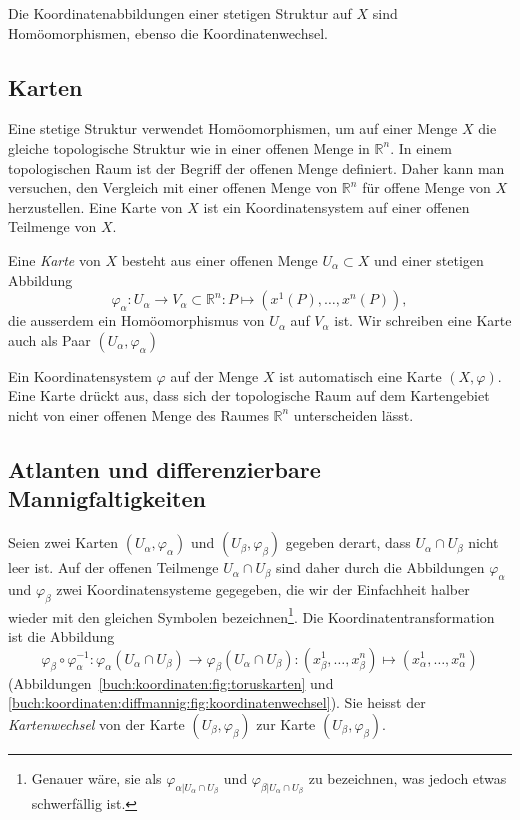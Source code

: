 Die Koordinatenabbildungen einer stetigen Struktur auf $X$ sind
Homöomorphismen, ebenso die Koordinatenwechsel.

%
%
\subsection{Karten}
Eine stetige Struktur verwendet Homöomorphismen, um auf einer Menge $X$
die gleiche topologische Struktur wie in einer offenen Menge in
$\mathbb{R}^n$.
In einem topologischen Raum ist der Begriff der offenen Menge definiert.
Daher kann man versuchen, den Vergleich mit einer offenen Menge von
$\mathbb{R}^n$ für offene Menge von $X$ herzustellen.
Eine Karte von $X$ ist ein Koordinatensystem auf einer offenen Teilmenge
von $X$.

\begin{definition}[Karte]
Eine \emph{Karte} von $X$ besteht aus einer offenen Menge $U_\alpha\subset X$
und einer stetigen Abbildung
\[
\varphi_\alpha
\colon
U_\alpha\to V_\alpha\subset\mathbb{R}^n
:
P
\mapsto
(x^1(P),\dots,x^n(P)),
\]
die ausserdem ein Homöomorphismus von $U_\alpha$ auf $V_\alpha$ ist.
Wir schreiben eine Karte auch als Paar $(U_\alpha,\varphi_\alpha)$
%
\end{definition}

Ein Koordinatensystem $\varphi$ auf der Menge $X$ ist automatisch eine
Karte $(X,\varphi)$.
Eine Karte drückt aus, dass sich der topologische Raum auf dem
Kartengebiet nicht von einer offenen Menge des Raumes $\mathbb{R}^n$
unterscheiden lässt.

%
%
\subsection{Atlanten und differenzierbare Mannigfaltigkeiten}
%
%
Seien zwei Karten $(U_\alpha,\varphi_\alpha)$ und $(U_\beta,\varphi_\beta)$
gegeben derart, dass $U_\alpha\cap U_\beta$ nicht leer ist.
Auf der offenen Teilmenge $U_\alpha\cap U_\beta$ sind daher durch
die Abbildungen $\varphi_\alpha$ und $\varphi_\beta$ zwei
Koordinatensysteme gegegeben, die wir der Einfachheit halber wieder
mit den gleichen Symbolen bezeichnen\footnote{Genauer wäre, sie als
$\varphi_{\alpha|U_\alpha\cap U_\beta}$ und
$\varphi_{\beta|U_\alpha\cap U_\beta}$ zu bezeichnen, was jedoch
etwas schwerfällig ist.}.
Die Koordinatentransformation ist die Abbildung
\[
\varphi_\beta\circ\varphi_\alpha^{-1}
\colon
\varphi_\alpha(U_\alpha\cap U_\beta)
\to
\varphi_\beta(U_\alpha\cap U_\beta)
:
(x_\beta^1,\dots,x_\beta^n)
\mapsto
(x_\alpha^1,\dots,x_\alpha^n)
\]
(Abbildungen~\ref{buch:koordinaten:fig:toruskarten} und
\ref{buch:koordinaten:diffmannig:fig:koordinatenwechsel}).
Sie heisst der {\em Kartenwechsel} von der Karte $(U_\beta,\varphi_\beta)$
zur Karte $(U_\beta,\varphi_\beta)$.
%

